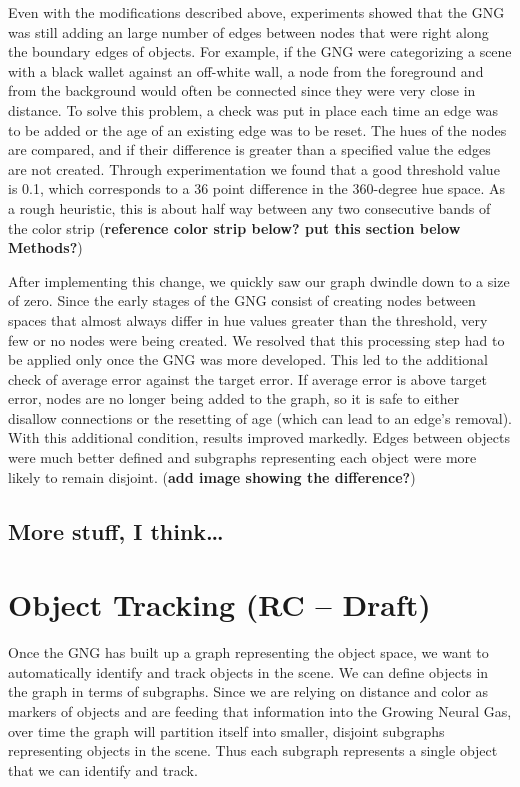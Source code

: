 \documentclass{article}
\renewcommand{\|}{\origbar} %
\begin{document}
Even with the modifications described above, experiments showed that the GNG was still adding an large number of edges between nodes that were right along the boundary edges of objects. For example, if the GNG were categorizing a scene with a black wallet against an off-white wall, a node from the foreground and from the background would often be connected since they were very close in distance. To solve this problem, a check was put in place each time an edge was to be added or the age of an existing edge was to be reset. The hues of the nodes are compared, and if their difference is greater than a specified value the edges are not created. Through experimentation we found that a good threshold value is 0.1, which corresponds to a 36 point difference in the 360-degree hue space. As a rough heuristic, this is about half way between any two consecutive bands of the color strip ({\bf reference color strip below? put this section below Methods?})

After implementing this change, we quickly saw our graph dwindle down to a size of zero. Since the early stages of the GNG consist of creating nodes between spaces that almost always differ in hue values greater than the threshold, very few or no nodes were being created. We resolved that this processing step had to be applied only once the GNG was more developed. This led to the additional check of average error against the target error. If average error is above target error, nodes are no longer being added to the graph, so it is safe to either disallow connections or the resetting of age (which can lead to an edge's removal). With this additional condition, results improved markedly. Edges between objects were much better defined and subgraphs representing each object were more likely to remain disjoint. ({\bf add image showing the difference?})

\subsection{More stuff, I think\dots}

\section{Object Tracking (RC -- Draft)}

Once the GNG has built up a graph representing the object space, we want to automatically identify and track objects in the scene. We can define objects in the graph in terms of subgraphs. Since we are relying on distance and color as markers of objects and are feeding that information into the Growing Neural Gas, over time the graph will partition itself into smaller, disjoint subgraphs representing objects in the scene. Thus each subgraph represents a single object that we can identify and track.
\end{document}
